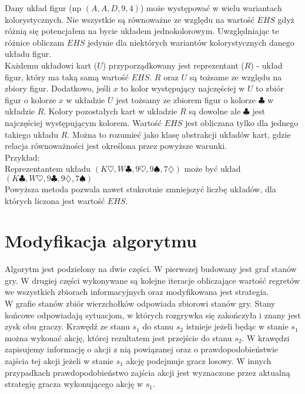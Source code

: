\documentclass[licencjacka]{pracamgr}
\begin{document}
\noindent
Dany układ figur (np $(A,A,D,9,4)$) może występować w wielu wariantach kolorystycznych. Nie wszystkie są równoważne ze względu
na wartość $EHS$ gdyż różnią się potencjałem na bycie układem jednokolorowym. Uwzględniając te różnice obliczam $EHS$ jedynie
dla niektórych wariantów kolorystycznych danego układu figur. \\

\noindent
Każdemu układowi kart ($U$) przyporządkowany jest reprezentant ($R$) - układ figur, który ma taką samą wartość $EHS$.
$R$ oraz $U$ są tożsame ze względu na zbiory figur. Dodatkowo, jeśli $x$ to kolor występujący najczęściej w $U$
to zbiór figur o kolorze $x$ w układzie $U$ jest tożsamy ze zbiorem figur o kolorze $\clubsuit$ w układzie $R$.
Kolory pozostałych kart w układzie $R$ są dowolne ale $\clubsuit$ jest najczęściej występującym kolorem. Wartość
$EHS$ jest obliczana tylko dla jednego takiego układu $R$. Można to rozumieć jako klasę abstrakcji układów kart, gdzie
relacja równoważności jest określona przez powyższe warunki. \\

\noindent
Przykład: \\

\noindent
Reprezentantem układu $(K\heartsuit, W\clubsuit, 9\heartsuit, 9\spadesuit, 7\diamondsuit)$ może być układ
$(K\clubsuit, W\heartsuit, 9\clubsuit, 9\diamondsuit, 7\spadesuit)$ \\

\noindent
Powyższa metoda pozwala nawet stukrotnie zmniejszyć liczbę układów, dla których liczona jest wartość $EHS$.

\section{Modyfikacja algorytmu}

\noindent
Algorytm jest podzielony na dwie części. W pierwszej budowany jest graf stanów gry. W drugiej części
wykonywane są kolejne iteracje obliczające wartość regretów we wszystkich zbiorach informacyjnych oraz
modyfikowana jest strategia. \\

\noindent
W grafie stanów zbiór wierzchołków odpowiada zbiorowi stanów gry. Stany końcowe odpowiadają
sytuacjom, w których rozgrywka się zakończyła i znany jest zysk obu graczy. Krawędź ze stanu $s_1$ do stanu $s_2$
istnieje jeżeli będąc w stanie $s_1$ można wykonać akcję, której rezultatem jest przejście do stanu
$s_2$. W krawędzi zapisujemy informację o akcji z nią powiązanej oraz o prawdopodobieństwie zajścia
tej akcji jeżeli w stanie $s_1$ akcję podejmuje gracz losowy. W innych przypadkach prawdopodobieństwo
zajścia akcji jest wyznaczone przez aktualną strategię gracza wykonującego akcję w $s_1$. \\
\end{document}
